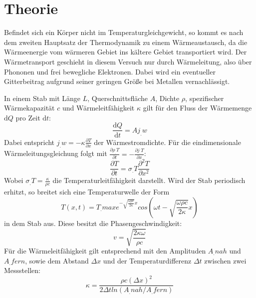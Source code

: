 
\section{Theorie}
\label{sec:Theorie}

Befindet sich ein Körper nicht im Temperaturgleichgewicht, so kommt es nach dem zweiten Hauptsatz der Thermodynamik zu einem Wärmeaustausch, da die Wärmeenergie vom wärmeren Gebiet ins kältere Gebiet transportiert wird. Der Wärmetransport geschieht in diesem Versuch nur durch Wärmeleitung, also über Phononen und frei bewegliche Elektronen. Dabei wird ein eventueller Gitterbeitrag aufgrund seiner geringen Größe bei Metallen vernachlässigt.

In einem Stab mit Länge $L$, Querschnittsfläche $A$, Dichte $\rho$, spezifischer Wärmekapazität $c$ und Wärmeleitfähigkeit $\kappa$ gilt für den Fluss der Wärmemenge $\mathrm{d}Q$ pro Zeit $\mathrm{d}t$:
\begin{equation}
\frac{\mathrm{d}Q}{\mathrm{d}t} = A j_.w \label{eq:dQ/dt}
\end{equation}    
Dabei entspricht $j_.w = -\kappa \frac{\partial T}{\partial x}$ der Wärmestromdichte. 
Für die eindimensionale Wärmeleitungsgleichung folgt mit $\frac{\partial \rho_.T}{\partial t} = -\frac{\partial j_.T}{\partial x}$:
\begin{equation}
\frac{\partial T}{\partial t} = \sigma_.T \frac{\partial^2 T}{\partial x^2} \label{eq:T/t}
\end{equation}
Wobei $\sigma_.T = \frac{\kappa}{\rho c}$ die Temperaturleitfähigkeit darstellt.
Wird der Stab periodisch erhitzt, so breitet sich eine Temperaturwelle der Form
\begin{equation}
T(x, t) = T_.{max} e^{-\sqrt{\frac{\omega\rho c}{2\kappa}} x}cos\left(\omega t-\sqrt{\frac{\omega\rho c}{2\kappa}}x\right) \label{eq:T}
\end{equation}
in dem Stab aus. Diese besitzt die Phasengeschwindigkeit:
\begin{equation}
v = \sqrt{\frac{2\kappa\omega}{\rho c}} \label{eq:v}
\end{equation}
Für die Wärmeleitfähigkeit gilt entsprechend mit den Amplituden $A_.{nah}$ und $A_.{fern}$, sowie dem Abstand $\Delta x$ und der Temperaturdifferenz $\Delta t$  zwischen zwei Messstellen: 
\begin{equation}
\kappa = \frac{\rho c(\Delta x)^2}{2\Delta t ln(A_.{nah}/A_.{fern})} \label{eq:k}
\end{equation}